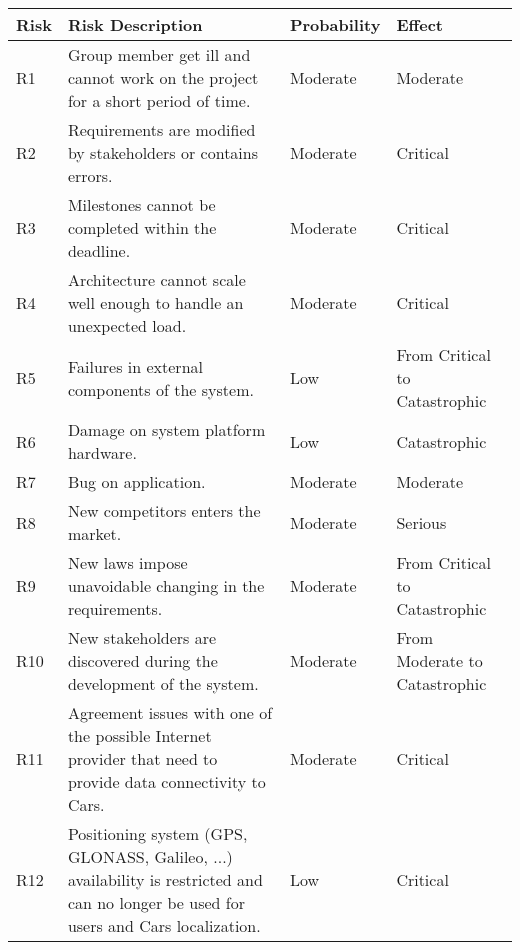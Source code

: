\noindent
\begin{tabular}{| l | p{7cm}  | l |  p{2.8cm} |}
\hline
\textbf{Risk} & \textbf{Risk Description} & \textbf{Probability} & \textbf{Effect}\\
\hline
R1 & Group member get ill and cannot work on the project for a short period of time. & Moderate & Moderate\\
\hline
R2 & Requirements are modified by stakeholders or contains errors. & Moderate & Critical\\
\hline
R3 & Milestones cannot be completed within the deadline. & Moderate & Critical\\
\hline
R4 & Architecture cannot scale well enough to handle an unexpected load. & Moderate & Critical\\
\hline
R5 & Failures in external components of the system. & Low & From Critical to Catastrophic\\
\hline
R6 & Damage on system platform hardware. & Low & Catastrophic\\
\hline
R7 & Bug on application. & Moderate & Moderate\\
\hline
R8 & New competitors enters the market. & Moderate & Serious\\
\hline
R9 & New laws impose unavoidable changing in the requirements. & Moderate & From Critical to Catastrophic\\
\hline
R10 & New stakeholders are discovered during the development of the system. & Moderate & From Moderate to Catastrophic\\
\hline
R11 & Agreement issues with one of the possible Internet provider that need to provide data connectivity to Cars. & Moderate & Critical\\
\hline
R12 & Positioning system (GPS, GLONASS, Galileo, ...) availability is restricted and can no longer be used for users and Cars localization. & Low & Critical\\
\hline
\end{tabular}

\bigskip

